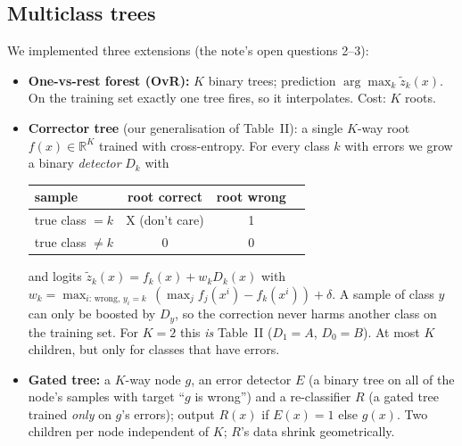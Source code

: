 \subsection{Multiclass trees}
\label{sec:multiclass}
We implemented three extensions (the note's open questions 2--3):
\begin{itemize}[leftmargin=*,itemsep=1pt]
\item \textbf{One-vs-rest forest (OvR):} $K$ binary trees; prediction $\arg\max_k \tilde z_k(x)$.
  On the training set exactly one tree fires, so it interpolates. Cost: $K$ roots.
\item \textbf{Corrector tree} (our generalisation of Table~II): a single $K$-way root $f(x)\in\mathbb{R}^K$
  trained with cross-entropy. For every class $k$ with errors we grow a binary \emph{detector} $D_k$
  with
  \begin{center}\small
  \begin{tabular}{lccc}
  \toprule
  sample & root correct & root wrong & \\\midrule
  true class $=k$ & X (don't care) & 1 & \\
  true class $\ne k$ & 0 & 0 &\\\bottomrule
  \end{tabular}
  \end{center}
  and logits $\tilde z_k(x)=f_k(x)+w_k D_k(x)$ with $w_k=\max_{i:\,\text{wrong},\,y_i=k}\,(\max_j f_j(x^i)-f_k(x^i))+\delta$.
  A sample of class $y$ can only be boosted by $D_y$, so the correction never harms another class on the
  training set. For $K=2$ this \emph{is} Table~II ($D_1=A$, $D_0=B$). At most $K$ children, but only
  for classes that have errors.
\item \textbf{Gated tree:} a $K$-way node $g$, an error detector $E$ (a binary tree on all of the node's
  samples with target ``$g$ is wrong'') and a re-classifier $R$ (a gated tree trained \emph{only} on $g$'s errors);
  output $R(x)$ if $E(x)=1$ else $g(x)$. Two children per node independent of $K$; $R$'s data shrink geometrically.
\end{itemize}
